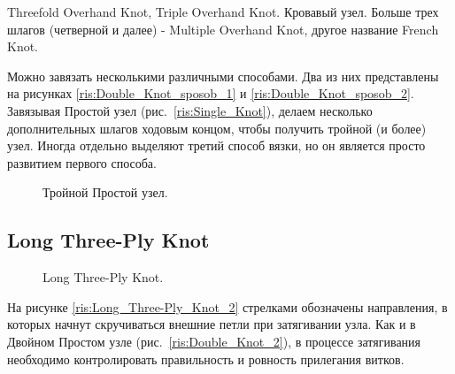 Threefold Overhand Knot, Triple Overhand Knot. Кровавый узел. Больше трех шлагов (четверной и далее) - Multiple Overhand Knot, другое название French Knot.

Можно завязать несколькими различными способами. Два из них представлены на рисунках \ref{ris:Double_Knot_sposob_1} и \ref{ris:Double_Knot_sposob_2}. Завязывая Простой узел (рис.~\ref{ris:Single_Knot}), делаем несколько дополнительных шлагов ходовым концом, чтобы получить тройной (и более) узел. Иногда отдельно выделяют третий способ вязки, но он является просто развитием первого способа.

\begin{figure}[H]\centering
	\subfloat[Завязывание]{\label{ris:Triple_Knot_sposob_1}
	\tcbox[enhanced jigsaw,colframe=black,opacityframe=0.5,opacityback=0.5,height=2.5cm]
		{\centering
			}
		}
\hfil
	\subfloat[Завязывание]{\label{ris:Triple_Knot_sposob_2}
	\tcbox[enhanced jigsaw,colframe=black,opacityframe=0.5,opacityback=0.5,height=2.5cm]
		{\centering
			}
		}
	\caption{Тройной Простой узел.}\label{ris:Triple_Knot}
\end{figure}

\subsection{Long Three-Ply Knot}

\begin{figure}[H]\centering
	\subfloat[Завязывание]{\label{ris:Long_Three-Ply_Knot_1}
	\tcbox[enhanced jigsaw,colframe=black,opacityframe=0.5,opacityback=0.5,height=3.5cm]
		{\centering
			}
		}
\hfil
	\subfloat[Завязывание]{\label{ris:Long_Three-Ply_Knot_2}
	\tcbox[enhanced jigsaw,colframe=black,opacityframe=0.5,opacityback=0.5,height=3.5cm]
		{\centering
			}
		}
\end{figure}
\begin{figure}[H]\centering
	\subfloat[Результат]{\label{ris:Long_Three-Ply_Knot_3}
	\tcbox[enhanced jigsaw,colframe=black,opacityframe=0.5,opacityback=0.5]
		{\centering
			}
		}
	\caption{Long Three-Ply Knot.}\label{ris:Long_Three-Ply_Knot}
\end{figure}

На рисунке \ref{ris:Long_Three-Ply_Knot_2} стрелками обозначены направления, в которых начнут скручиваться внешние петли при затягивании узла. Как и в Двойном Простом узле (рис.~\ref{ris:Double_Knot_2}), в процессе затягивания необходимо контролировать правильность и ровность прилегания витков.

